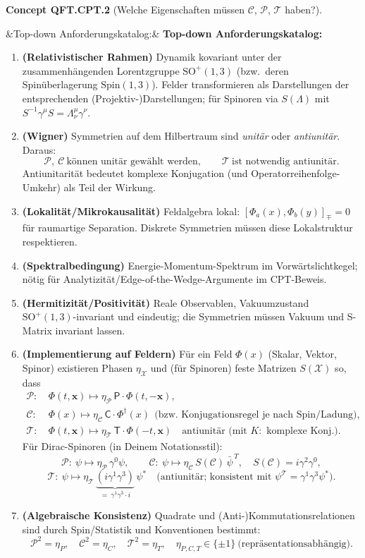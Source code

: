 \documentclass[10pt, letterpaper]{article}
\newcommand{\SO}{\mathrm{SO}}
\newcommand{\Spin}{\mathrm{Spin}}
\newenvironment{romanenum}[1][]
  {%
    \ifx&#1&
    \else
      \textbf{#1}\quad
    \fi
    \begin{enumerate}[label=\roman*)]
  }
  {%
    \end{enumerate}%
  }
\newcommand{\CustomHeading}[3]{%
  \par\medskip\noindent%
  \textbf{#1 #2} \textnormal{(#3)}.\enskip%
}
\newenvironment{CONC}[2]{\begin{unitbox}\CustomHeading{Concept}{#1}{#2}}{\end{unitbox}}
\begin{document}
\begin{CONC}{QFT.CPT.2}{Welche Eigenschaften müssen $\mathcal C$, $\mathcal P$, $\mathcal T$ haben?}
\begin{romanenum}[Top-down Anforderungskatalog:]
  \item \textbf{(Relativistischer Rahmen)} Dynamik kovariant unter der zusammenhängenden Lorentzgruppe $\SO^+(1,3)$ (bzw.\ deren Spinüberlagerung $\Spin(1,3)$). Felder transformieren als Darstellungen der entsprechenden (Projektiv-)Darstellungen; für Spinoren via $S(\Lambda)$ mit $S^{-1}\gamma^\mu S=\Lambda^\mu_\nu\gamma^\nu$.
  \item \textbf{(Wigner)} Symmetrien auf dem Hilbertraum sind \emph{unitär} oder \emph{antiunitär}. Daraus:
  \[
    \mathcal P,\ \mathcal C \ \text{können unitär gewählt werden},\qquad
    \mathcal T \ \text{ist notwendig antiunitär}.
  \]
  Antiunitarität bedeutet komplexe Konjugation (und Operatorreihenfolge-Umkehr) als Teil der Wirkung.
  \item \textbf{(Lokalität/Mikrokausalität)} Feldalgebra lokal: $[\Phi_a(x),\Phi_b(y)]_\mp=0$ für raumartige Separation. Diskrete Symmetrien müssen diese Lokalstruktur respektieren.
  \item \textbf{(Spektralbedingung)} Energie-Momentum-Spektrum im Vorwärtslichtkegel; nötig für Analytizität/Edge-of-the-Wedge-Argumente im CPT-Beweis.
  \item \textbf{(Hermitizität/Positivität)} Reale Observablen, Vakuumzustand $\SO^+(1,3)$-invariant und eindeutig; die Symmetrien müssen Vakuum und S-Matrix invariant lassen.
  \item \textbf{(Implementierung auf Feldern)} Für ein Feld $\Phi(x)$ (Skalar, Vektor, Spinor) existieren Phasen $\eta_{\mathcal X}$ und (für Spinoren) feste Matrizen $S(\mathcal X)$ so, dass
  \[
  \begin{aligned}
    \mathcal P:\ & \Phi(t,\mathbf x)\mapsto \eta_{\mathcal P}\,\mathsf P\!\cdot\!\Phi(t,-\mathbf x),\\
    \mathcal C:\ & \Phi(x)\mapsto \eta_{\mathcal C}\,\mathsf C\!\cdot\!\Phi^\dagger(x)\ \ \text{(bzw.\ Konjugationsregel je nach Spin/Ladung)},\\
    \mathcal T:\ & \Phi(t,\mathbf x)\mapsto \eta_{\mathcal T}\,\mathsf T\!\cdot\!\Phi(-t,\mathbf x)\quad\text{antiunitär (mit $K:$ komplexe Konj.)}.
  \end{aligned}
  \]
  Für Dirac-Spinoren (in Deinem Notationsstil):
  \[
    \mathcal P:\ \psi\mapsto \eta_{\mathcal P}\,\gamma^0\psi,\qquad
    \mathcal C:\ \psi\mapsto \eta_{\mathcal C}\,S(\mathcal C)\,\bar\psi^{\,T},\quad S(\mathcal C)=i\gamma^2\gamma^0,
  \]
  \[
    \mathcal T:\ \psi\mapsto \eta_{\mathcal T}\,\underbrace{(i\gamma^1\gamma^3)}_{=\ \gamma^1\gamma^3\cdot i}\, \psi^{*}
    \quad\text{(antiunitär; konsistent mit }\psi^{\mathcal T}=\gamma^1\gamma^3\psi^*).
  \]
  \item \textbf{(Algebraische Konsistenz)} Quadrate und (Anti-)Kommutationsrelationen sind durch Spin/Statistik und Konventionen bestimmt:
  \[
    \mathcal P^2=\eta_P,\quad \mathcal C^2=\eta_C,\quad \mathcal T^2=\eta_T,\quad
    \eta_{P,C,T}\in\{\pm1\}\ \text{(repräsentationsabhängig)}.
  \]
\end{romanenum}
\end{CONC}
\end{document}

